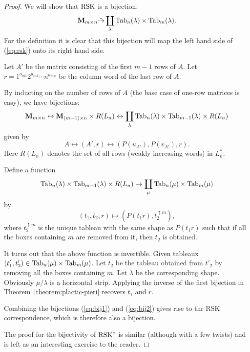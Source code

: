 \documentclass[11pt]{amsart}
\theoremstyle{definition}
\theoremstyle{example}
\newcommand{\Tab}{\textup{Tab}}
\newcommand{\rsk}{\textup{RSK}}
\begin{document}
\begin{proof}
  We will show that $\rsk$ is a bijection:
  \begin{displaymath}
    \mathbf M_{m\times n} \tilde\to \coprod_\lambda \Tab_n(\lambda)\times \Tab_m(\lambda).
  \end{displaymath}
  For the definition it is clear that this bijection will map the left hand side of (\ref{eq:rsk}) onto its right hand side.

  Let $A'$ be the matrix consisting of the first $m-1$ rows of $A$.
  Let $r=1^{a_{m1}}2^{a_{m2}}\dotsb n^{a_{mn}}$ be the column word of the last row of $A$.

  By inducting on the number of rows of $A$ (the base case of one-row matrices is easy), we have bijections:
  \begin{equation}
    \label{eq:bij1}
    \mathbf M_{m\times n} \leftrightarrow \mathbf M_{(m-1)\times n}\times R(L_n) \leftrightarrow \coprod_\lambda \Tab_n(\lambda)\times \Tab_{m-1}(\lambda)\times R(L_n)
  \end{equation}
  given by
  \begin{displaymath}
    A \leftrightarrow (A',r) \leftrightarrow (P(u_{A'}), P(v_{A'}), r).
  \end{displaymath}
  Here $R(L_n)$ denotes the set of all rows (weakly increasing words) in $L_n^*$.

  Define a function
  \begin{equation}
    \label{eq:bij2}
    \Tab_n(\lambda)\times \Tab_{m-1}(\lambda)\times R(L_n) \to \coprod_\mu \Tab_n(\mu)\times \Tab_m(\mu)
  \end{equation}
  by
  \begin{displaymath}
    (t_1, t_2, r)\mapsto (P(t_1r), t_2^{\uparrow m}),
  \end{displaymath}
  where $t_2^{\uparrow m}$ is the unique tableau with the same shape as $P(t_1r)$ such that if all the boxes containing $m$ are removed from it, then $t_2$ is obtained.

  It turns out that the above function is invertible.
  Given tableaux $(t'_1, t'_2)\in \Tab_n(\mu)\times \Tab_m(\mu)$.
  Let $t_2$ be the tableau obtained from $t'_2$ by removing all the boxes containing $m$.
  Let $\lambda$ be the corresponding shape.
  Obviously $\mu/\lambda$ is a horizontal strip.
  Applying the inverse of the first bijection in Theorem~\ref{theorem:plactic-pieri} recovers $t_1$ and $r$.

  Combining the bijections (\ref{eq:bij1}) and (\ref{eq:bij2}) gives rise to thr RSK correspondence, which is therefore also a bijection.

  The proof for the bijectivity of $\rsk^*$ is similar (although with a few twists) and is left as an interesting exercise to the reader.
\end{proof}
\end{document}
